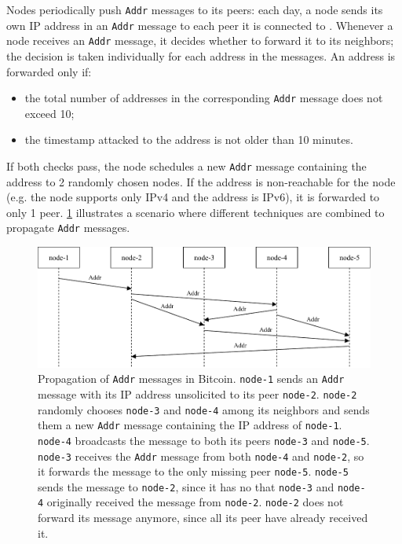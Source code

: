 \medskip
Nodes periodically push \texttt{Addr} messages to its peers:
each day, a node sends its own IP address in an \texttt{Addr} message to each peer it is connected to \cite{eclipse_attack_2015}.
Whenever a node receives an \texttt{Addr} message, it decides whether to forward it to its neighbors;
the decision is taken individually for each address in the messages.
An address is forwarded only if:
\begin{itemize}
	\item the total number of addresses in the corresponding \texttt{Addr} message does not exceed \num{10};
	\item the timestamp attacked to the address is not older than \num{10} minutes.
\end{itemize}
If both checks pass, the node schedules a new \texttt{Addr} message containing the address to \num{2} randomly chosen nodes.
If the address is non-reachable for the node (e.g. the node supports only IPv4 and the address is IPv6), it is forwarded to only \num{1} peer.
\cref{fig:addr_propagation} illustrates a scenario where different techniques are combined to propagate \texttt{Addr} messages.

\begin{figure}[ht]
	\centering
	\vspace*{0.4cm}
	\includegraphics[scale=1.04]{figures/addr_propagation}
	\vspace*{0.25cm}
	\caption[Propagation of Addr messages in Bitcoin]{
		Propagation of \texttt{Addr} messages in Bitcoin.
		\texttt{node-1} sends an \texttt{Addr} message with its IP address unsolicited to its peer \texttt{node-2}.
		\texttt{node-2} randomly chooses \texttt{node-3} and \texttt{node-4} among its neighbors and sends them a new \texttt{Addr} message containing the IP address of \texttt{node-1}.
		\texttt{node-4} broadcasts the message to both its peers \texttt{node-3} and \texttt{node-5}.
		\texttt{node-3} receives the \texttt{Addr} message from both \texttt{node-4} and \texttt{node-2}, so it forwards the message to the only missing peer \texttt{node-5}.
		\texttt{node-5} sends the message to \texttt{node-2}, since it has no that \texttt{node-3} and \texttt{node-4} originally received the message from \texttt{node-2}.
		\texttt{node-2} does not forward its message anymore, since all its peer have already received it.
	}
	\label{fig:addr_propagation}
\end{figure}

